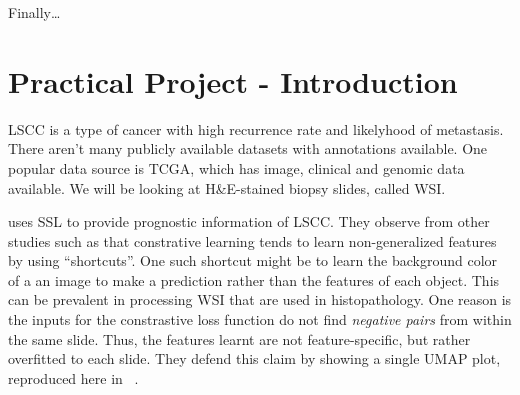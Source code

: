 \documentclass[10pt,twocolumn,letterpaper]{article}
\begin{document}

Finally\dots{}

\newpage

\section{Practical Project - Introduction}

\gls{LSCC} is a type of cancer with high recurrence rate and likelyhood of metastasis. There aren't many publicly available datasets with annotations available. One popular data source is \gls{TCGA}, which has image, clinical and genomic data available. We will be looking at H\&E-stained biopsy slides, called \gls{WSI}.

\cite{sslUMAP} uses \gls{SSL} to provide prognostic information of \gls{LSCC}. They observe from other studies such as \cite{contrastiveShortcut} that constrative learning tends to learn non-generalized features by using ``shortcuts''. One such shortcut might be to learn the background color of a an image to make a prediction rather than the features of each object. This can be prevalent in processing \gls{WSI} that are used in histopathology. One reason is the inputs for the constrastive loss function do not find \textit{negative pairs} from within the same slide. Thus, the features learnt are not feature-specific, but rather overfitted to each slide. They defend this claim by showing a single \gls{UMAP} plot, reproduced here in ~.
\end{document}
